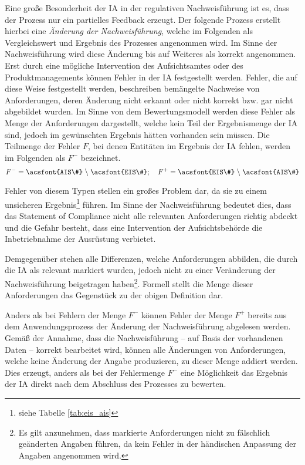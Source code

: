     Eine große Besonderheit der \ac{IA} in der regulativen Nachweisführung ist es, dass der Prozess nur ein partielles Feedback erzeugt.
    Der folgende Prozess erstellt hierbei eine \textit{Änderung der Nachweisführung}, welche im Folgenden als Vergleichswert und Ergebnis des Prozesses angenommen wird.
    Im Sinne der Nachweisführung wird diese Änderung bis auf Weiteres als korrekt angenommen.
    Erst durch eine mögliche Intervention des Aufsichtsamtes oder des Produktmanagements können Fehler in der \ac{IA} festgestellt werden.
    Fehler, die auf diese Weise festgestellt werden, beschreiben bemängelte Nachweise von Anforderungen, deren Änderung nicht erkannt oder nicht korrekt bzw. gar nicht abgebildet wurden.
    Im Sinne von dem Bewertungsmodell werden diese Fehler als Menge der Anforderungen dargestellt, welche kein Teil der Ergebnismenge der \ac{IA} sind, jedoch im gewünschten Ergebnis hätten vorhanden sein müssen.
    Die Teilmenge der Fehler $F$, bei denen Entitäten im Ergebnis der \ac{IA} fehlen, werden im Folgenden als $F^-$ bezeichnet.
    $$
        F^- = \text{\acsfont{AIS\#}} \;\backslash\; \text{\acsfont{EIS\#}}; \quad 
        F^+ = \text{\acsfont{EIS\#}} \;\backslash\; \text{\acsfont{AIS\#}}
    $$
    
    \noindent
    Fehler von diesem Typen stellen ein großes Problem dar, da sie zu einem unsicheren Ergebnis\footnote{siehe Tabelle \ref{tab:eis_ais}} führen.
    Im Sinne der Nachweisführung bedeutet dies, dass das Statement of Compliance nicht alle relevanten Anforderungen richtig abdeckt und die Gefahr besteht, dass eine Intervention der Aufsichtsbehörde die Inbetriebnahme der Ausrüstung verbietet.
    
    \medskip
    Demgegenüber stehen alle Differenzen, welche Anforderungen abbilden, die durch die \ac{IA} als relevant markiert wurden, jedoch nicht zu einer Veränderung der Nachweisführung beigetragen haben\footnote{Es gilt anzunehmen, dass markierte Anforderungen nicht zu fälschlich geänderten Angaben führen, da kein Fehler in der händischen Anpassung der Angaben angenommen wird.}.
    Formell stellt die Menge dieser Anforderungen das Gegenstück zu der obigen Definition dar.
    
    \medskip
    Anders als bei Fehlern der Menge $F^-$ können Fehler der Menge $F^+$ bereits aus dem Anwendungsprozess der Änderung der Nachweisführung abgelesen werden.
    Gemäß der Annahme, dass die Nachweisführung -- auf Basis der vorhandenen Daten -- korrekt bearbeitet wird, können alle Änderungen von Anforderungen, welche keine Änderung der Angabe produzieren, zu dieser Menge addiert werden.
    Dies erzeugt, anders als bei der Fehlermenge $F^-$ eine Möglichkeit das Ergebnis der \ac{IA} direkt nach dem Abschluss des Prozesses zu bewerten.

